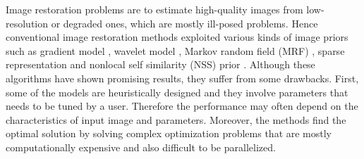 \documentclass[journal]{IEEEtran}
\begin{document}
Image restoration problems are to estimate high-quality images from 
low-resolution or degraded ones, which are mostly ill-posed problems.
Hence conventional image restoration methods exploited
various kinds of image priors such as
gradient model \cite{rudin1992nonlinear,osher2005iterative,weiss2007makes}, 
wavelet model \cite{chang2000adaptive,remenyi2014image}, 
Markov random field (MRF) \cite{roth2005fields,lan2006efficient,li2009markov},
sparse representation \cite{elad2006image,mairal2009non,dong2013nonlocally} 
and nonlocal self similarity (NSS) prior \cite{buades2005non,dabov2007image,gu2014weighted}. 
Although these algorithms have shown promising results, 
they suffer from some drawbacks. First, some of the models are heuristically 
designed and they involve parameters that needs to be tuned by a user. 
Therefore the performance may often depend on the characteristics of
input image and parameters. Moreover, the methods find the optimal solution 
by solving complex optimization problems that are
mostly computationally expensive and also difficult to be parallelized.
 
\end{document}
